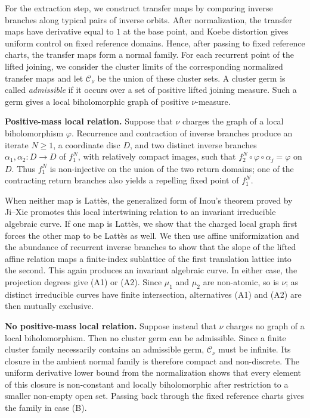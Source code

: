 \documentclass[11pt]{amsart}
\numberwithin{equation}{section}
\theoremstyle{plain}
\theoremstyle{definition}
\theoremstyle{remark}
\begin{document}
For the extraction step, we construct transfer maps
by comparing
inverse branches along typical pairs of inverse orbits. 
After normalization,
the transfer maps have
derivative equal to $1$ at the base point, and Koebe distortion gives
uniform control on fixed reference domains. Hence,
after passing to fixed reference charts, the transfer maps form a
normal family. For each recurrent point of the lifted joining, we
consider the cluster limits of the corresponding normalized transfer
maps and let $\mathcal C_\nu$ be the union of these cluster sets. A
cluster germ is called {\it admissible}
if it occurs over a set of positive
lifted joining measure. Such a germ gives a local biholomorphic graph
of positive $\nu$-measure.

\smallskip
\noindent
\textbf{Positive-mass local relation.}
Suppose that $\nu$ charges the graph of a local biholomorphism
$\varphi$. Recurrence and contraction of inverse branches produce an
iterate $N\geq1$, a coordinate disc $D$, and two distinct inverse
branches $\alpha_1,\alpha_2\colon D\to D$ of $f_1^N$, with relatively
compact images, such that
$f_2^N\circ\varphi\circ\alpha_j=\varphi$ on $D$. Thus $f_1^N$ is non-injective on the union of the two return domains;
one of the contracting return branches also yields a repelling fixed
point of $f_1^N$.

When neither map is Latt\`es, the generalized form of Inou's theorem
\cite{Inou11}
proved by Ji--Xie \cite[Theorem 2.1]{JiXieLocalRigidityJuliaSets}
promotes
this local intertwining relation to an invariant irreducible algebraic
curve. If one map is Latt\`es, we show that the charged local graph first forces the
other map to be Latt\`es as well. We then use affine uniformization and the
abundance of recurrent inverse branches to show that the slope of
the lifted affine relation maps a finite-index sublattice of the first
translation lattice into the second. This again produces an invariant
algebraic curve. In either case, the projection degrees give
\textup{(A1)} or \textup{(A2)}.
Since $\mu_1$ and $\mu_2$ are non-atomic, so is $\nu$; as distinct
irreducible curves have finite intersection, alternatives
\textup{(A1)} and \textup{(A2)} are then mutually exclusive.

\smallskip
\noindent
\textbf{No positive-mass local relation.}
Suppose instead that $\nu$ charges no graph of a local
biholomorphism. Then no cluster germ can be admissible. Since a finite
cluster family necessarily contains an admissible germ,
$\mathcal C_\nu$ must be infinite. Its closure in the ambient normal
family is therefore compact and non-discrete. The uniform derivative
lower bound from the normalization shows that every element of this
closure is non-constant and locally biholomorphic after restriction to
a smaller non-empty open set. Passing back through the fixed reference
charts gives the family in case \textup{(B)}.
\end{document}
